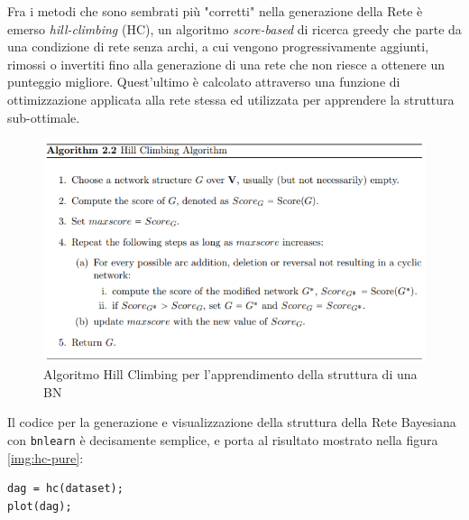 \documentclass[hidelinks, 12pt]{article}
\begin{document}
Fra i metodi che sono sembrati più "corretti" nella generazione della Rete è emerso \textit{hill-climbing} (HC), un algoritmo \textit{score-based} di ricerca greedy che parte da una condizione di rete senza archi, a cui vengono progressivamente aggiunti, rimossi o invertiti fino alla generazione di una rete che non riesce a ottenere un punteggio migliore. Quest'ultimo è calcolato attraverso una funzione di ottimizzazione applicata alla rete stessa ed utilizzata per apprendere la struttura sub-ottimale\cite{thesis:bnlearn-marco}.

\begin{figure}[H]
	\centering
	\includegraphics[scale=1]{images/05_00_hc_algo.png}
	\caption[Algoritmo Hill Climbing per l'apprendimento della struttura di una BN]{Algoritmo Hill Climbing per l'apprendimento della struttura di una BN}
	\label{img:hc-algorithm}
\end{figure}

Il codice per la generazione e visualizzazione della struttura della Rete Bayesiana con \texttt{bnlearn} è decisamente semplice, e porta al risultato mostrato nella figura \ref{img:hc-pure}:

\begin{verbatim}
dag = hc(dataset);
plot(dag);
\end{verbatim}
\end{document}
